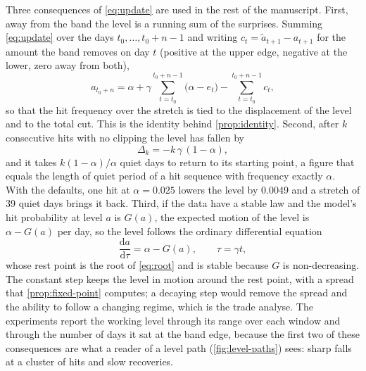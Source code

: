 Three consequences of \cref{eq:update} are used in the rest of the manuscript. First, away from the band the level is a running sum of the surprises. Summing \cref{eq:update} over the days $t_0, \dots, t_0 + n - 1$ and writing $c_t = \tilde a_{t+1} - a_{t+1}$ for the amount the band removes on day $t$ (positive at the upper edge, negative at the lower, zero away from both),
\begin{equation}
a_{t_0+n} = \alpha + \gamma \sum_{t=t_0}^{t_0+n-1} \bigl(\alpha - e_t\bigr) - \sum_{t=t_0}^{t_0+n-1} c_t,
\label{eq:telescoped}
\end{equation}
so that the hit frequency over the stretch is tied to the displacement of the level and to the total cut. This is the identity behind \cref{prop:identity}. Second, after $k$ consecutive hits with no clipping the level has fallen by
\begin{equation}
\Delta_k = -k\,\gamma\,(1 - \alpha),
\label{eq:cluster-drop}
\end{equation}
and it takes $k(1-\alpha)/\alpha$ quiet days to return to its starting point, a figure that equals the length of quiet period of a hit sequence with frequency exactly $\alpha$. With the defaults, one hit at $\alpha = 0.025$ lowers the level by 0.0049 and a stretch of 39 quiet days brings it back. Third, if the data have a stable law and the model's hit probability at level $a$ is $G(a)$, the expected motion of the level is $\alpha - G(a)$ per day, so the level follows the ordinary differential equation
\begin{equation}
\frac{\mathrm{d}a}{\mathrm{d}\tau} = \alpha - G(a), \qquad \tau = \gamma t,
\label{eq:mean-field}
\end{equation}
whose rest point is the root of \cref{eq:root} and is stable because $G$ is non-decreasing. The constant step keeps the level in motion around the rest point, with a spread that \cref{prop:fixed-point} computes; a decaying step would remove the spread and the ability to follow a changing regime, which is the trade \citet{angelopoulos2024} analyse. The experiments report the working level through its range over each window and through the number of days it sat at the band edge, because the first two of these consequences are what a reader of a level path (\cref{fig:level-paths}) sees: sharp falls at a cluster of hits and slow recoveries.
